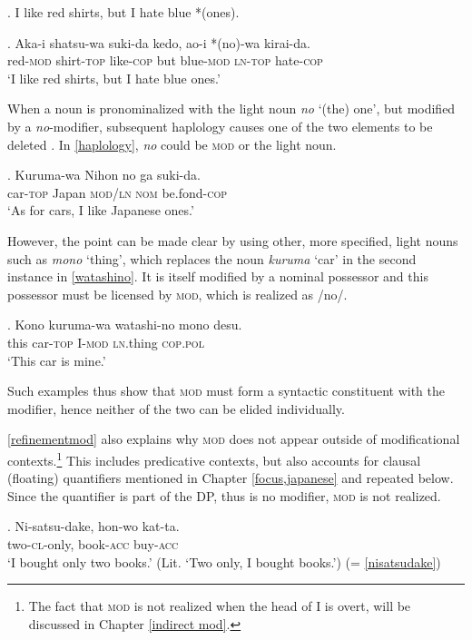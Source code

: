 \documentclass [output=book,colorlinks,citecolor=brown]{langscibook}
\begin{document}
\ex. I like red shirts, but I hate blue *(ones). \label{redshirts}

\exg. Aka-i shatsu-wa suki-da kedo, ao-i *(no)-wa kirai-da.\\
red-\textsc{mod} shirt-\textsc{top} like-\textsc{cop} but blue-\textsc{mod} \textsc{ln}-\textsc{top} hate-\textsc{cop}\\
`I like red shirts, but I hate blue ones.’ \label{redshirtsjapanese}

When a noun is pronominalized with the light noun \textit{no} `(the) one’, but modified by a \textit{no}-modifier, subsequent haplology causes one of the two elements to be deleted \citep[13531–1352]{hiraiwa:2016:ellipsis}. In \ref{haplology}, \textit{no} could be \textsc{mod} or the light noun. %

\exg. Kuruma-wa Nihon no ga suki-da.\\
car-\textsc{top} Japan \textsc{mod}/\textsc{ln} \textsc{nom} be.fond-\textsc{cop}\\
`As for cars, I like Japanese ones.’ \label{haplology}

However, the point can be made clear by using other, more specified, light nouns such as \textit{mono} `thing’, which replaces the noun \textit{kuruma} `car’ in the second instance in \ref{watashino}. It is itself modified by a nominal possessor and this possessor must be licensed by \textsc{mod}, which is realized as /no/.

\exg. Kono kuruma-wa watashi-no mono desu.\\
this car-\textsc{top} I-\textsc{mod} \textsc{ln}.thing \textsc{cop.pol}\\
`This car is mine.’ \label{watashino}

Such examples thus show that \textsc{mod} must form a syntactic constituent with the modifier, hence neither of the two can be elided individually.

 \ref{refinementmod} also explains why \textsc{mod} does not appear outside of modificational contexts.\footnote{The fact that \textsc{mod} is not realized when the head of I is overt, will be discussed in Chapter \ref{indirect mod}.} This includes predicative contexts, but also accounts for clausal (floating) quantifiers mentioned in Chapter \ref{focus,japanese} and repeated below. Since the quantifier is part of the DP, thus is no modifier, \textsc{mod} is not realized.

\exg. Ni-satsu-dake, hon-wo kat-ta.\\
two-\textsc{cl}-only, book-\textsc{acc} buy-\textsc{acc}\\
`I bought only two books.’ (Lit. `Two only, I bought books.’) \null \hfill (= \ref{nisatsudake})
\end{document}
